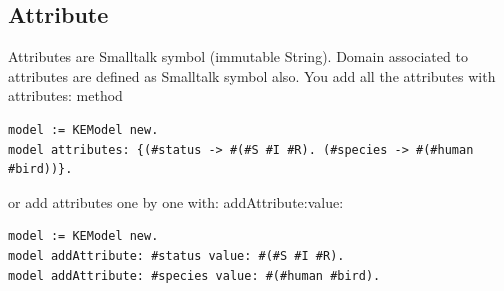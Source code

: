 \documentclass[11pt]{article}
\begin{document}
\subsection{Attribute}
\label{sec:org2f65e19}
   Attributes are Smalltalk symbol (immutable String).
   Domain associated to attributes are defined as Smalltalk symbol also.
You add all the attributes with attributes: method
\begin{verbatim}
model := KEModel new.
model attributes: {(#status -> #(#S #I #R). (#species -> #(#human #bird))}.
\end{verbatim}

or add attributes one by one with: addAttribute:value:
\begin{verbatim}
model := KEModel new.
model addAttribute: #status value: #(#S #I #R).
model addAttribute: #species value: #(#human #bird).
\end{verbatim}
\end{document}
